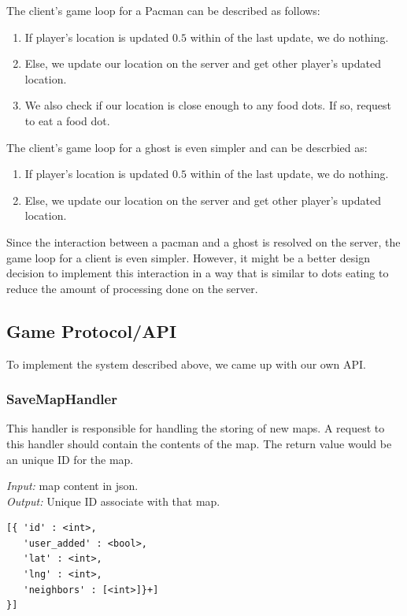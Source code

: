 \documentclass{acm_proc_article-sp}
\begin{document}
The client's game loop for a Pacman can be described as follows:

\begin{enumerate}
\item If player's location is updated $0.5$ within of the last update, we do nothing.
\item Else, we update our location on the server and get other player's updated location.
\item We also check if our location is close enough to any food dots. If so, request to eat a food dot.
\end{enumerate}

The client's game loop for a ghost is even simpler and can be descrbied as:

\begin{enumerate}
\item If player's location is updated $0.5$ within of the last update, we do nothing.
\item Else, we update our location on the server and get other player's updated location.
\end{enumerate}

Since the interaction between a pacman and a ghost is resolved on the
server, the game loop for a client is even simpler. However, it might
be a better design decision to implement this interaction in a way
that is similar to dots eating to reduce the amount of processing done
on the server.

\subsection{Game Protocol/API}
To implement the system described above, we came up with our own API.

\subsubsection{SaveMapHandler}
This handler is responsible for handling the storing of new maps. A
request to this handler should contain the contents of the map. The
return value would be an unique ID for the map.

\emph{Input:} map content in json.\\
\emph{Output:} Unique ID associate with that map.

\medskip
\begin{lstlisting}[caption=Map format in json]
[{ 'id' : <int>,
   'user_added' : <bool>,
   'lat' : <int>,
   'lng' : <int>,
   'neighbors' : [<int>]}+]
}]
\end{lstlisting}
\end{document}
